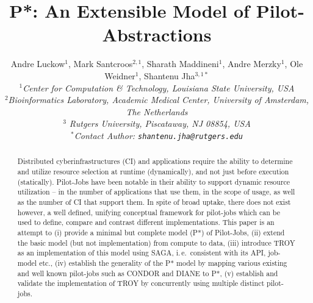 \documentclass[conference,final]{IEEEtran}
\title{P*: An Extensible Model of Pilot-Abstractions}
\date{}
\newcommand{\up}{\vspace*{-1em}}
\newcommand{\upp}{\vspace*{-0.5em}}
\begin{document}
\ifpdf
{}
\else
{}
\fi

\author{
  Andre Luckow$^{1}$, Mark Santcroos$^{2,1}$, Sharath Maddineni$^{1}$, Andre Merzky$^{1}$, Ole Weidner$^{1}$, Shantenu Jha$^{3,1*}$\\
  \small{\emph{$^{1}$Center for Computation \& Technology, Louisiana State University, USA}}\\
 \small{\emph{$^{2}$Bioinformatics Laboratory, Academic Medical Center, University of Amsterdam, The Netherlands}}\\
 \small{\emph{$^{3}$ Rutgers University, Piscataway, NJ 08854, USA}}\\
  \small{\emph{$^{*}$Contact Author: \texttt{shantenu.jha@rutgers.edu}}}\\
  \up\up\up\up }

\maketitle

\begin{abstract}
  \up Distributed cyberinfrastructures (CI) and applications require
  the ability to determine and utilize resource selection at runtime
  (dynamically), and not just before execution (statically).
  Pilot-Jobs have been notable in their ability to support dynamic
  resource utilization -- in the number of applications that use them,
  in the scope of usage, as well as the number of CI that support
  them.  In spite of broad uptake, there does not exist however, a
  well defined, unifying conceptual framework for pilot-jobs which can
  be used to define, compare and contrast different
  implementations. This paper is an attempt to (i) provide a minimal
  but complete model (P*) of Pilot-Jobs, (ii) extend the basic model
  (but not implementation) from compute to data, (iii) introduce TROY
  as an implementation of this model using SAGA, i.\,e.\ consistent
  with its API, job-model etc., (iv) establish the generality of the
  P* model by mapping various existing and well known pilot-jobs such
  as CONDOR and DIANE to P*, (v) establish and validate the
  implementation of TROY by concurrently using multiple distinct
  pilot-jobs. \upp\upp\upp\upp
\end{abstract}
\end{document}
